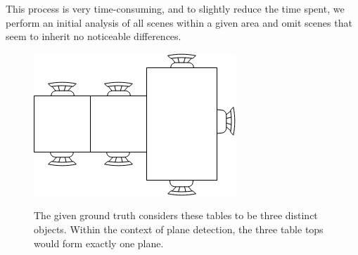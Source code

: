 \documentclass[main.tex]{subfiles}
\begin{document}
This process is very time-consuming, and to slightly reduce the time spent, we perform an initial analysis of all scenes within a 
given area and omit scenes that seem to inherit no noticeable differences.


\begin{figure} [!ht]
	\centering
	\includegraphics[width=10 cm]{images/tables.png}
	\label{fig:tables}
    \caption{The given ground truth considers these tables to be three distinct objects. Within the context of 
    plane detection, the three table tops would form exactly one plane.}
\end{figure}
\end{document}
